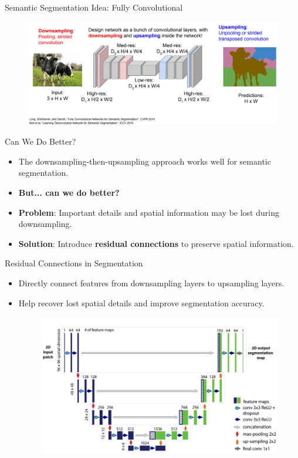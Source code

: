 \documentclass[10pt]{beamer}
\theoremstyle{remark}
\theoremstyle{definition}
\begin{document}
\begin{frame}{Semantic Segmentation Idea: Fully Convolutional}


\begin{figure}
\centering
\includegraphics[width=1.0\textwidth,height=1.0\textheight,keepaspectratio]{./images/sem_11.png}
\end{figure}
\end{frame}

\begin{frame}{Can We Do Better?}
\begin{itemize}
    \item The downsampling-then-upsampling approach works well for semantic segmentation.
    \item \textbf{But... can we do better?}
        \item \textbf{Problem}: Important details and spatial information may be lost during downsampling.
    \pause
    \item \textbf{Solution}: Introduce \textbf{residual connections} to preserve spatial information.
\end{itemize}
\end{frame}

\begin{frame}{Residual Connections in Segmentation}
\begin{itemize}

        \item Directly connect features from downsampling layers to upsampling layers.
        \item Help recover lost spatial details and improve segmentation accuracy.
    \begin{figure}
    \centering
    \includegraphics[width=1.0\textwidth,height=0.7\textheight,keepaspectratio]{./images/Unet.png}
    \end{figure}
    
\end{itemize}
\end{frame}
\end{document}
